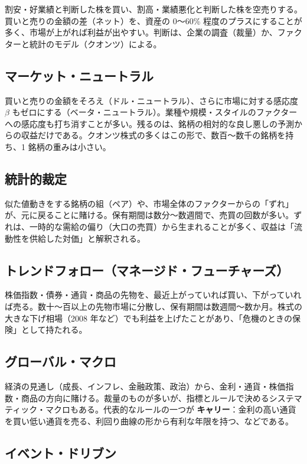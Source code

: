 割安・好業績と判断した株を買い、割高・業績悪化と判断した株を空売りする。買いと売りの金額の差（ネット）を、資産の 0〜60\% 程度のプラスにすることが多く、市場が上がれば利益が出やすい。判断は、企業の調査（裁量）か、ファクターと統計のモデル（クオンツ）による。

\subsection{マーケット・ニュートラル}

買いと売りの金額をそろえ（ドル・ニュートラル）、さらに市場に対する感応度 $\beta$ もゼロにする（ベータ・ニュートラル）。業種や規模・スタイルのファクターへの感応度も打ち消すことが多い。残るのは、銘柄の相対的な良し悪しの予測からの収益だけである。クオンツ株式の多くはこの形で、数百〜数千の銘柄を持ち、1 銘柄の重みは小さい。

\subsection{統計的裁定}

似た値動きをする銘柄の組（ペア）や、市場全体のファクターからの「ずれ」が、元に戻ることに賭ける。保有期間は数分〜数週間で、売買の回数が多い。ずれは、一時的な需給の偏り（大口の売買）から生まれることが多く、収益は「流動性を供給した対価」と解釈される。

\subsection{トレンドフォロー（マネージド・フューチャーズ）}

株価指数・債券・通貨・商品の先物を、最近上がっていれば買い、下がっていれば売る。数十〜百以上の先物市場に分散し、保有期間は数週間〜数か月。株式の大きな下げ相場（2008 年など）でも利益を上げたことがあり、「危機のときの保険」として持たれる。

\subsection{グローバル・マクロ}

経済の見通し（成長、インフレ、金融政策、政治）から、金利・通貨・株価指数・商品の方向に賭ける。裁量のものが多いが、指標とルールで決めるシステマティック・マクロもある。代表的なルールの一つが \textbf{キャリー}：金利の高い通貨を買い低い通貨を売る、利回り曲線の形から有利な年限を持つ、などである。

\subsection{イベント・ドリブン}

